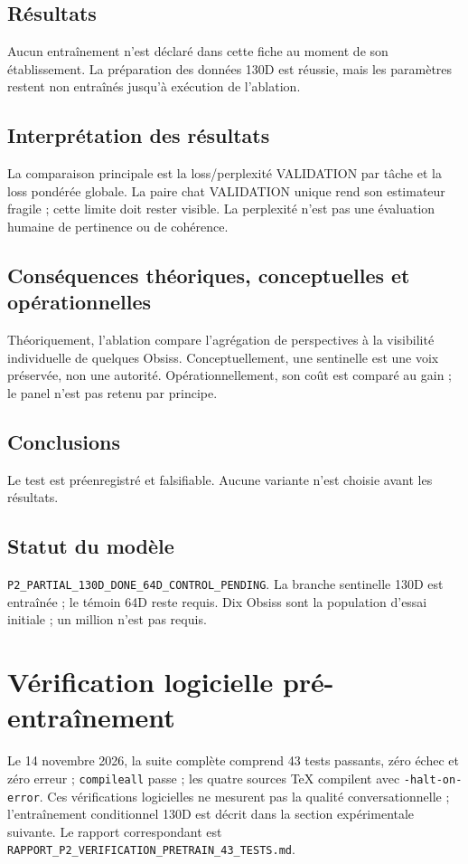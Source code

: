 \documentclass[11pt,a4paper]{report}
\begin{document}
\section{Résultats}
Aucun entraînement n'est déclaré dans cette fiche au moment de son établissement. La préparation des données 130D est réussie, mais les paramètres restent non entraînés jusqu'à exécution de l'ablation.
\section{Interprétation des résultats}
La comparaison principale est la loss/perplexité VALIDATION par tâche et la loss pondérée globale. La paire chat VALIDATION unique rend son estimateur fragile ; cette limite doit rester visible. La perplexité n'est pas une évaluation humaine de pertinence ou de cohérence.
\section{Conséquences théoriques, conceptuelles et opérationnelles}
Théoriquement, l'ablation compare l'agrégation de perspectives à la visibilité individuelle de quelques Obsiss. Conceptuellement, une sentinelle est une voix préservée, non une autorité. Opérationnellement, son coût est comparé au gain ; le panel n'est pas retenu par principe.
\section{Conclusions}
Le test est préenregistré et falsifiable. Aucune variante n'est choisie avant les résultats.
\section{Statut du modèle}
\texttt{P2\_PARTIAL\_130D\_DONE\_64D\_CONTROL\_PENDING}. La branche sentinelle 130D est entraînée ; le témoin 64D reste requis. Dix Obsiss sont la population d’essai initiale ; un million n’est pas requis.

\chapter{Vérification logicielle pré-entraînement}
Le 14 novembre 2026, la suite complète comprend 43 tests passants, zéro échec et zéro erreur ; \texttt{compileall} passe ; les quatre sources TeX compilent avec \texttt{-halt-on-error}. Ces vérifications logicielles ne mesurent pas la qualité conversationnelle ; l’entraînement conditionnel 130D est décrit dans la section expérimentale suivante. Le rapport correspondant est \texttt{RAPPORT\_P2\_VERIFICATION\_PRETRAIN\_43\_TESTS.md}.
\end{document}
